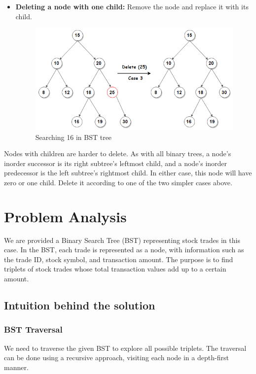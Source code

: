 \documentclass[11pt]{article}
\begin{document}
\begin{itemize}
            \item \textbf{Deleting a node with one child:} Remove the node and replace it with its child.

            \begin{figure}[H]
            \centering
            \includegraphics[scale=0.7]{DeletionBSTC3.png}
            \caption{Searching 16 in BST tree}\label{DeletionBSTC3}
        \end{figure}
        \end{itemize}

        Nodes with children are harder to delete. As with all binary trees, a node’s inorder successor is its right subtree’s leftmost child, and a node’s inorder predecessor is the left subtree’s rightmost child. In either case, this node will have zero or one child. Delete it according to one of the two simpler cases above.

	
\section{Problem Analysis}
We are provided a Binary Search Tree (BST) representing stock trades in this case. In the BST, each trade is represented as a node, with information such as the trade ID, stock symbol, and transaction amount. The purpose is to find triplets of stock trades whose total transaction values add up to a certain amount.
    \subsection{Intuition behind the solution}
    \subsubsection{BST Traversal}
We need to traverse the given BST to explore all possible triplets. The traversal can be done using a recursive approach, visiting each node in a depth-first manner.
\end{document}
